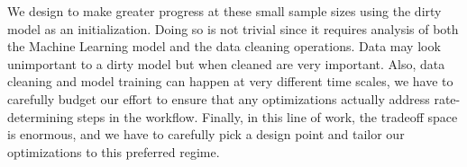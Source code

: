We design \sys to make greater progress at these small sample sizes using the dirty model as an initialization.
Doing so is not trivial since it requires analysis of both the Machine Learning model and the data cleaning operations.
Data may look unimportant to a dirty model but when cleaned are very important.
Also, data cleaning and model training can happen at very different time scales, we have to carefully budget our effort to ensure that any optimizations actually address rate-determining steps in the workflow.
Finally, in this line of work, the tradeoff space is enormous, and we have to carefully pick a design point and tailor our optimizations to this preferred regime.
\fi



